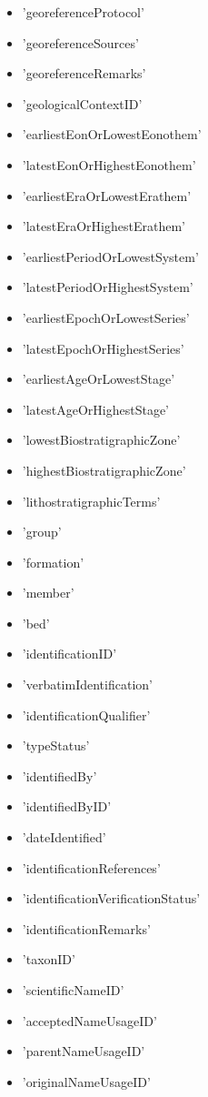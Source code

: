 \documentclass[a4paper]{book}
\begin{document}
\begin{Details}
\begin{itemize}
\item{} 'georeferenceProtocol'
\item{} 'georeferenceSources'
\item{} 'georeferenceRemarks'
\item{} 'geologicalContextID'
\item{} 'earliestEonOrLowestEonothem'
\item{} 'latestEonOrHighestEonothem'
\item{} 'earliestEraOrLowestErathem'
\item{} 'latestEraOrHighestErathem'
\item{} 'earliestPeriodOrLowestSystem'
\item{} 'latestPeriodOrHighestSystem'
\item{} 'earliestEpochOrLowestSeries'
\item{} 'latestEpochOrHighestSeries'
\item{} 'earliestAgeOrLowestStage'
\item{} 'latestAgeOrHighestStage'
\item{} 'lowestBiostratigraphicZone'
\item{} 'highestBiostratigraphicZone'
\item{} 'lithostratigraphicTerms'
\item{} 'group'
\item{} 'formation'
\item{} 'member'
\item{} 'bed'
\item{} 'identificationID'
\item{} 'verbatimIdentification' 
\item{} 'identificationQualifier' 
\item{} 'typeStatus' 
\item{} 'identifiedBy' 
\item{} 'identifiedByID'
\item{} 'dateIdentified' 
\item{} 'identificationReferences'
\item{} 'identificationVerificationStatus'
\item{} 'identificationRemarks'
\item{} 'taxonID'
\item{} 'scientificNameID'
\item{} 'acceptedNameUsageID'
\item{} 'parentNameUsageID'
\item{} 'originalNameUsageID'

\end{itemize}
\end{Details}
\end{document}
